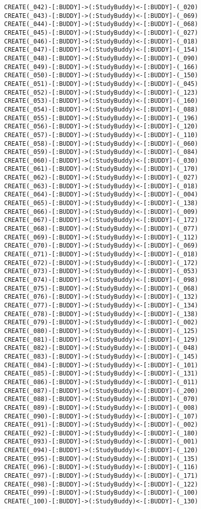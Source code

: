 \begin{lstlisting}
CREATE(_042)-[:BUDDY]->(:StudyBuddy)<-[:BUDDY]-(_020)
CREATE(_043)-[:BUDDY]->(:StudyBuddy)<-[:BUDDY]-(_069)
CREATE(_044)-[:BUDDY]->(:StudyBuddy)<-[:BUDDY]-(_068)
CREATE(_045)-[:BUDDY]->(:StudyBuddy)<-[:BUDDY]-(_027)
CREATE(_046)-[:BUDDY]->(:StudyBuddy)<-[:BUDDY]-(_018)
CREATE(_047)-[:BUDDY]->(:StudyBuddy)<-[:BUDDY]-(_154)
CREATE(_048)-[:BUDDY]->(:StudyBuddy)<-[:BUDDY]-(_090)
CREATE(_049)-[:BUDDY]->(:StudyBuddy)<-[:BUDDY]-(_166)
CREATE(_050)-[:BUDDY]->(:StudyBuddy)<-[:BUDDY]-(_150)
CREATE(_051)-[:BUDDY]->(:StudyBuddy)<-[:BUDDY]-(_045)
CREATE(_052)-[:BUDDY]->(:StudyBuddy)<-[:BUDDY]-(_123)
CREATE(_053)-[:BUDDY]->(:StudyBuddy)<-[:BUDDY]-(_160)
CREATE(_054)-[:BUDDY]->(:StudyBuddy)<-[:BUDDY]-(_088)
CREATE(_055)-[:BUDDY]->(:StudyBuddy)<-[:BUDDY]-(_196)
CREATE(_056)-[:BUDDY]->(:StudyBuddy)<-[:BUDDY]-(_120)
CREATE(_057)-[:BUDDY]->(:StudyBuddy)<-[:BUDDY]-(_110)
CREATE(_058)-[:BUDDY]->(:StudyBuddy)<-[:BUDDY]-(_060)
CREATE(_059)-[:BUDDY]->(:StudyBuddy)<-[:BUDDY]-(_084)
CREATE(_060)-[:BUDDY]->(:StudyBuddy)<-[:BUDDY]-(_030)
CREATE(_061)-[:BUDDY]->(:StudyBuddy)<-[:BUDDY]-(_170)
CREATE(_062)-[:BUDDY]->(:StudyBuddy)<-[:BUDDY]-(_027)
CREATE(_063)-[:BUDDY]->(:StudyBuddy)<-[:BUDDY]-(_018)
CREATE(_064)-[:BUDDY]->(:StudyBuddy)<-[:BUDDY]-(_004)
CREATE(_065)-[:BUDDY]->(:StudyBuddy)<-[:BUDDY]-(_138)
CREATE(_066)-[:BUDDY]->(:StudyBuddy)<-[:BUDDY]-(_009)
CREATE(_067)-[:BUDDY]->(:StudyBuddy)<-[:BUDDY]-(_172)
CREATE(_068)-[:BUDDY]->(:StudyBuddy)<-[:BUDDY]-(_077)
CREATE(_069)-[:BUDDY]->(:StudyBuddy)<-[:BUDDY]-(_112)
CREATE(_070)-[:BUDDY]->(:StudyBuddy)<-[:BUDDY]-(_069)
CREATE(_071)-[:BUDDY]->(:StudyBuddy)<-[:BUDDY]-(_018)
CREATE(_072)-[:BUDDY]->(:StudyBuddy)<-[:BUDDY]-(_172)
CREATE(_073)-[:BUDDY]->(:StudyBuddy)<-[:BUDDY]-(_053)
CREATE(_074)-[:BUDDY]->(:StudyBuddy)<-[:BUDDY]-(_098)
CREATE(_075)-[:BUDDY]->(:StudyBuddy)<-[:BUDDY]-(_068)
CREATE(_076)-[:BUDDY]->(:StudyBuddy)<-[:BUDDY]-(_132)
CREATE(_077)-[:BUDDY]->(:StudyBuddy)<-[:BUDDY]-(_134)
CREATE(_078)-[:BUDDY]->(:StudyBuddy)<-[:BUDDY]-(_138)
CREATE(_079)-[:BUDDY]->(:StudyBuddy)<-[:BUDDY]-(_002)
CREATE(_080)-[:BUDDY]->(:StudyBuddy)<-[:BUDDY]-(_125)
CREATE(_081)-[:BUDDY]->(:StudyBuddy)<-[:BUDDY]-(_129)
CREATE(_082)-[:BUDDY]->(:StudyBuddy)<-[:BUDDY]-(_048)
CREATE(_083)-[:BUDDY]->(:StudyBuddy)<-[:BUDDY]-(_145)
CREATE(_084)-[:BUDDY]->(:StudyBuddy)<-[:BUDDY]-(_101)
CREATE(_085)-[:BUDDY]->(:StudyBuddy)<-[:BUDDY]-(_131)
CREATE(_086)-[:BUDDY]->(:StudyBuddy)<-[:BUDDY]-(_011)
CREATE(_087)-[:BUDDY]->(:StudyBuddy)<-[:BUDDY]-(_200)
CREATE(_088)-[:BUDDY]->(:StudyBuddy)<-[:BUDDY]-(_070)
CREATE(_089)-[:BUDDY]->(:StudyBuddy)<-[:BUDDY]-(_008)
CREATE(_090)-[:BUDDY]->(:StudyBuddy)<-[:BUDDY]-(_107)
CREATE(_091)-[:BUDDY]->(:StudyBuddy)<-[:BUDDY]-(_002)
CREATE(_092)-[:BUDDY]->(:StudyBuddy)<-[:BUDDY]-(_180)
CREATE(_093)-[:BUDDY]->(:StudyBuddy)<-[:BUDDY]-(_001)
CREATE(_094)-[:BUDDY]->(:StudyBuddy)<-[:BUDDY]-(_120)
CREATE(_095)-[:BUDDY]->(:StudyBuddy)<-[:BUDDY]-(_135)
CREATE(_096)-[:BUDDY]->(:StudyBuddy)<-[:BUDDY]-(_116)
CREATE(_097)-[:BUDDY]->(:StudyBuddy)<-[:BUDDY]-(_171)
CREATE(_098)-[:BUDDY]->(:StudyBuddy)<-[:BUDDY]-(_122)
CREATE(_099)-[:BUDDY]->(:StudyBuddy)<-[:BUDDY]-(_100)
CREATE(_100)-[:BUDDY]->(:StudyBuddy)<-[:BUDDY]-(_130)
\end{lstlisting}
